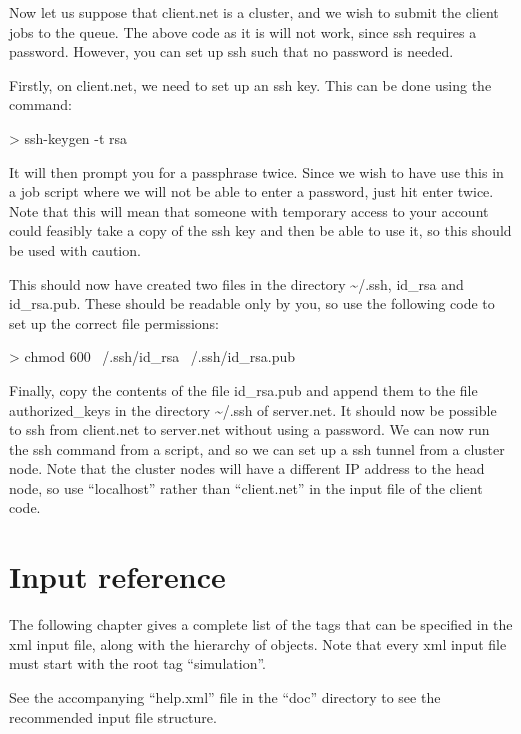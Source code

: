 \documentclass[11pt,english,fleqn]{report}
\newenvironment{code}{%
\footnotesize 
\verbatim
}{
\endverbatim
\normalsize
}
\begin{document}
Now let us suppose that client.net is a cluster, and we wish to submit
the client jobs to the queue. The above code as it is will not work,
since ssh requires a password. However, you can set up ssh such that
no password is needed. 

Firstly, on client.net, we need to set up an ssh key. This can be
done using the command:

\begin{code}
> ssh-keygen -t rsa
\end{code}

It will then prompt you for a passphrase twice. Since we wish to have
use this in a job script where we will not be able to enter a password,
just hit enter twice. Note that this will mean that someone with temporary
access to your account could feasibly take a copy of the ssh key and
then be able to use it, so this should be used with caution.

This should now have created two files in the directory \textasciitilde{}/.ssh,
id\_rsa and id\_rsa.pub. These should be readable only by you, so
use the following code to set up the correct file permissions:

\begin{code}
> chmod 600 ~/.ssh/id_rsa ~/.ssh/id_rsa.pub
\end{code}

Finally, copy the contents of the file id\_rsa.pub and append them
to the file authorized\_keys in the directory \textasciitilde{}/.ssh
of server.net. It should now be possible to ssh from client.net to
server.net without using a password. We can now run the ssh command
from a script, and so we can set up a ssh tunnel from a cluster node.
Note that the cluster nodes will have a different IP address to the
head node, so use {}``localhost'' rather than {}``client.net''
in the input file of the client code.


\chapter{Input reference}

\label{hierarchy}

The following chapter gives a complete list of the tags that can be
specified in the xml input file, along with the hierarchy of objects.
Note that every xml input file must start with the root tag {}``simulation''. 

See the accompanying {}``help.xml'' file in the {}``doc'' directory
to see the recommended input file structure.
\end{document}
